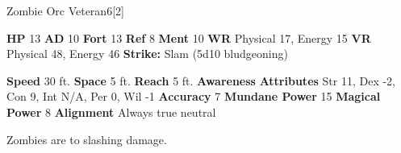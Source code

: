   \begin{monsubsection}{Zombie Orc Veteran}{6}[2]
    \vspace{-1em}\vspace{-1em}
    \vspace{0em}

    
    

    \begin{spellcontent}
      \begin{spelltargetinginfo}
        \pari \textbf{HP} 13 \monsep
          \textbf{AD} 10 \monsep
          \textbf{Fort} 13 \monsep
          \textbf{Ref} 8 \monsep
          \textbf{Ment} 10
        \pari \textbf{WR} Physical 17, Energy 15 \monsep
        \textbf{VR} Physical 48, Energy 46
        \pari \textbf{Strike:}
            Slam  (5d10 bludgeoning)
      \end{spelltargetinginfo}
    \end{spellcontent}
    \begin{monsterfooter}
      \pari \textbf{Speed} 30 ft. \monsep
        \textbf{Space} 5 ft. \monsep
        \textbf{Reach} 5 ft.
      \pari \textbf{Awareness} 
      \pari \textbf{Attributes}
        Str 11, Dex -2,
        Con 9, Int N/A,
        Per 0, Wil -1
      \pari \textbf{Accuracy} 7 \monsep
        \textbf{Mundane Power} 15 \monsep
      \textbf{Magical Power} 8
      \pari \textbf{Alignment} Always true neutral
    \end{monsterfooter}
  \end{monsubsection}
          Zombies are  to slashing damage.
  

